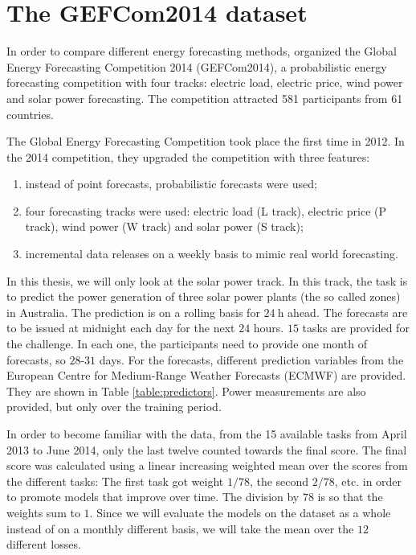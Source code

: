\section{The GEFCom2014 dataset}
\label{sec:gefcom-dataset}

In order to compare different energy forecasting methods, 
\Textcite{Hong2016} organized the Global Energy Forecasting Competition 2014 (GEFCom2014), 
a probabilistic energy forecasting competition with four tracks: 
electric load, electric price, wind power and solar power forecasting. 
The competition attracted 581 participants from 61 countries. 

The Global Energy Forecasting Competition took place the first time in 2012. 
In the 2014 competition, they upgraded the competition with three features: 
\begin{enumerate}
    \item instead of point forecasts, probabilistic forecasts were used;
    \item four forecasting tracks were used: electric load (L track), 
    electric price (P track), wind power (W track) and solar power (S track);
    \item incremental data releases on a weekly basis to mimic real world forecasting.
\end{enumerate}

In this thesis, we will only look at the solar power track. 
In this track, the task is to predict the power generation of three 
solar power plants (the so called zones) in Australia. 
The prediction is on a rolling basis for \(\SI{24}{\hour}\) ahead. 
The forecasts are to be issued at midnight each day for the next \(24\) hours. 
\(15\) tasks are provided for the challenge. In each one, the participants need to 
provide one month of forecasts, so \(28\)-\(31\) days.
For the forecasts, different prediction variables from the 
European Centre for Medium-Range Weather Forecasts (ECMWF) are provided. 
They are shown in Table \ref{table:predictors}.
Power measurements are also provided, but only over the training period. 

In order to become familiar with the data, from the 15 available tasks from April 2013 to June 2014, 
only the last twelve counted towards the final score. 
The final score was calculated using a linear increasing weighted mean over the scores from the different tasks: 
The first task got weight \(1/78\), the second \(2/78\), etc. 
in order to promote models that improve over time. The division by \(78\) is so that the 
weights sum to \(1\).
Since we will evaluate the models on the dataset as a whole instead of on a monthly different basis, 
we will take the mean over the \(12\) different losses.

